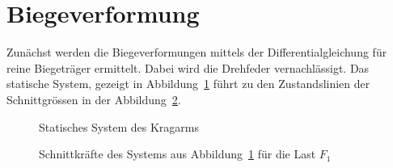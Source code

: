 \documentclass[
  11pt,
  letterpaper,
]{scrreprt}
\begin{document}
\section{Biegeverformung}\label{biegeverformung}

Zunächst werden die Biegeverformungen mittels der Differentialgleichung
für reine Biegeträger ermittelt. Dabei wird die Drehfeder
vernachlässigt. Das statische System, gezeigt in
Abbildung~\ref{fig-kragarm-sys} führt zu den Zustandslinien der
Schnittgrössen in der Abbildung~\ref{fig-skkragarmreal}.

\begin{figure}[H]


\caption{\label{fig-kragarm-sys}Statisches System des Kragarms}

\end{figure}%

\begin{figure}[H]


\caption{\label{fig-skkragarmreal}Schnittkräfte des Systems aus
Abbildung~\ref{fig-kragarm-sys} für die Last \(F_1\)}

\end{figure}%
\end{document}
